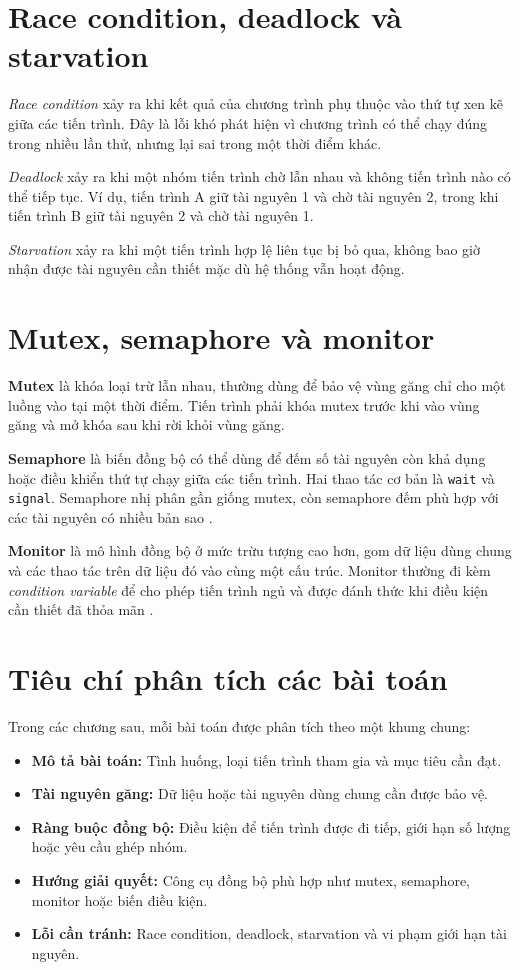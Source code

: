 \section{Race condition, deadlock và starvation}

\textit{Race condition} xảy ra khi kết quả của chương trình phụ thuộc vào thứ tự xen kẽ giữa các tiến trình. Đây là lỗi khó phát hiện vì chương trình có thể chạy đúng trong nhiều lần thử, nhưng lại sai trong một thời điểm khác.

\textit{Deadlock} xảy ra khi một nhóm tiến trình chờ lẫn nhau và không tiến trình nào có thể tiếp tục. Ví dụ, tiến trình A giữ tài nguyên 1 và chờ tài nguyên 2, trong khi tiến trình B giữ tài nguyên 2 và chờ tài nguyên 1.

\textit{Starvation} xảy ra khi một tiến trình hợp lệ liên tục bị bỏ qua, không bao giờ nhận được tài nguyên cần thiết mặc dù hệ thống vẫn hoạt động.

\section{Mutex, semaphore và monitor}

\textbf{Mutex} là khóa loại trừ lẫn nhau, thường dùng để bảo vệ vùng găng chỉ cho một luồng vào tại một thời điểm. Tiến trình phải khóa mutex trước khi vào vùng găng và mở khóa sau khi rời khỏi vùng găng.

\textbf{Semaphore} là biến đồng bộ có thể dùng để đếm số tài nguyên còn khả dụng hoặc điều khiển thứ tự chạy giữa các tiến trình. Hai thao tác cơ bản là \texttt{wait} và \texttt{signal}. Semaphore nhị phân gần giống mutex, còn semaphore đếm phù hợp với các tài nguyên có nhiều bản sao \cite{dijkstra}.

\textbf{Monitor} là mô hình đồng bộ ở mức trừu tượng cao hơn, gom dữ liệu dùng chung và các thao tác trên dữ liệu đó vào cùng một cấu trúc. Monitor thường đi kèm \textit{condition variable} để cho phép tiến trình ngủ và được đánh thức khi điều kiện cần thiết đã thỏa mãn \cite{hoare}.

\section{Tiêu chí phân tích các bài toán}

Trong các chương sau, mỗi bài toán được phân tích theo một khung chung:

\begin{itemize}
    \item \textbf{Mô tả bài toán:} Tình huống, loại tiến trình tham gia và mục tiêu cần đạt.
    \item \textbf{Tài nguyên găng:} Dữ liệu hoặc tài nguyên dùng chung cần được bảo vệ.
    \item \textbf{Ràng buộc đồng bộ:} Điều kiện để tiến trình được đi tiếp, giới hạn số lượng hoặc yêu cầu ghép nhóm.
    \item \textbf{Hướng giải quyết:} Công cụ đồng bộ phù hợp như mutex, semaphore, monitor hoặc biến điều kiện.
    \item \textbf{Lỗi cần tránh:} Race condition, deadlock, starvation và vi phạm giới hạn tài nguyên.
\end{itemize}
